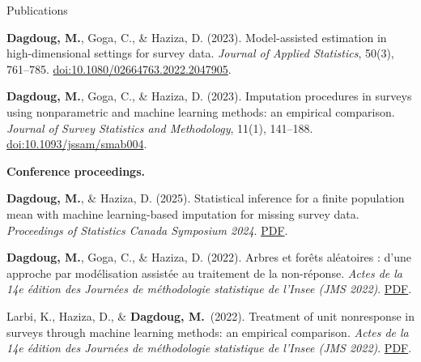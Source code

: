 \documentclass{resume}
\newcommand{\me}{\textbf{Dagdoug, M.}}                               %
\newcommand{\doi}[1]{\href{https://doi.org/#1}{doi:#1}}
\newcommand{\site}[1]{\href{https://mehdidagdoug.github.io/files/#1}{PDF}}
\begin{document}
\begin{rSection}{Publications}
\begin{etaremune}
  \item \me, Goga, C., \& Haziza, D. (2023). Model-assisted estimation in high-dimensional settings for survey data. \emph{Journal of Applied Statistics}, 50(3), 761--785. \doi{10.1080/02664763.2022.2047905}.

  \item \me, Goga, C., \& Haziza, D. (2023). Imputation procedures in surveys using nonparametric and machine learning methods: an empirical comparison. \emph{Journal of Survey Statistics and Methodology}, 11(1), 141--188. \doi{10.1093/jssam/smab004}.
\end{etaremune}

\textbf{Conference proceedings.}
\begin{etaremune}
  \item \me, \& Haziza, D. (2025). Statistical inference for a finite population mean with machine learning-based imputation for missing survey data. \emph{Proceedings of Statistics Canada Symposium 2024}. \site{ProceedingsSymposium(25).pdf}.

  \item \me, Goga, C., \& Haziza, D. (2022). Arbres et forêts aléatoires : d'une approche par modélisation assistée au traitement de la non-réponse. \emph{Actes de la 14e édition des Journées de méthodologie statistique de l'Insee (JMS 2022)}. \site{jms2022.pdf}.

  \item Larbi, K., Haziza, D., \& \me\ (2022). Treatment of unit nonresponse in surveys through machine learning methods: an empirical comparison. \emph{Actes de la 14e édition des Journées de méthodologie statistique de l'Insee (JMS 2022)}. \site{Larbi_Haziza_Dagdoug22.pdf}.
\end{etaremune}
\end{rSection}
\end{document}
